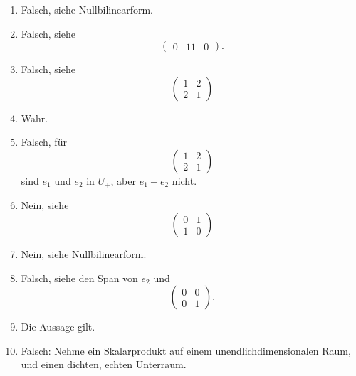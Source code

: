 \begin{solution}
  \begin{enumerate}[leftmargin=*]
    \item
      Falsch, siehe Nullbilinearform.
    \item
      Falsch, siehe
      \[
        \begin{pmatrix}
          0 & 1
          1 & 0
        \end{pmatrix}.
      \]
    \item
      Falsch, siehe
      \[
        \begin{pmatrix}
          1 & 2 \\
          2 & 1
        \end{pmatrix}
      \]
    \item
      Wahr.
    \item
      Falsch, für
      \[
        \begin{pmatrix}
          1 & 2 \\
          2 & 1
        \end{pmatrix}
      \]
      sind $e_1$ und $e_2$ in $U_+$, aber $e_1 - e_2$ nicht.
    \item
      Nein, siehe
      \[
        \begin{pmatrix}
          0 & 1 \\
          1 & 0
        \end{pmatrix}
      \]
    \item
      Nein, siehe Nullbilinearform.
    \item
      Falsch, siehe den Span von $e_2$ und
      \[
        \begin{pmatrix}
          0 & 0 \\
          0 & 1
        \end{pmatrix}.
      \]
    \item
      Die Aussage gilt.
    \item
      Falsch: Nehme ein Skalarprodukt auf einem unendlichdimensionalen Raum, und einen dichten, echten Unterraum.
  \end{enumerate}
\end{solution}


